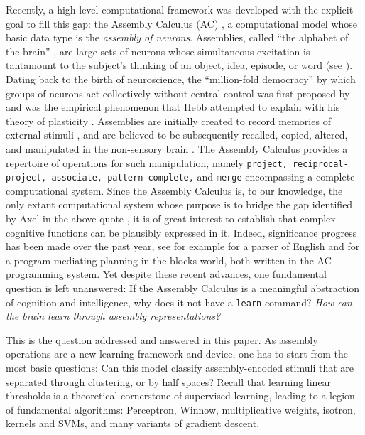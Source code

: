 \documentclass[final,12pt]{colt2022} %
\begin{document}
Recently, a high-level computational framework was developed with the explicit goal to fill this gap: the Assembly Calculus (AC)  \citep{papadimitriou2020brain}, a computational model whose basic data type is the {\em assembly of neurons}.  Assemblies, called ``the alphabet of the brain'' \citep{buzsaki2019brain}, are large sets of neurons whose simultaneous excitation is tantamount to the subject's thinking of an object, idea, episode, or word (see \citet{Josh2016}). Dating back to the birth of neuroscience, the ``million-fold democracy'' by which groups of neurons act collectively without central control was first proposed by \citet{sherrington1906integrative} and was the empirical phenomenon that Hebb attempted to explain with his theory of plasticity \citep{hebb1949}. Assemblies are initially created to record memories of external stimuli \citep{quiroga2016neuronal}, and are believed to be subsequently recalled, copied, altered, and manipulated in the non-sensory brain \citep{Josh2012, Buzsaki:10}.  The Assembly Calculus provides a repertoire of operations for such manipulation, namely {\tt project, reciprocal-project, associate, pattern-complete,} and {\tt merge} encompassing a complete computational system.  Since the Assembly Calculus is, to our knowledge, the only extant computational system whose purpose is to bridge the gap identified by Axel in the above quote \citep{AxelNeuron2018}, it is of great interest to establish that complex cognitive functions can be plausibly expressed in it.  Indeed, significance progress has been made over the past year, see for example \citet{mitropolsky2021biologically} for a parser of English and  \citet{damore2021planning} for a program mediating planning in the blocks world, both written in the AC programming system.  Yet despite these recent advances, one fundamental question is left unanswered: If the Assembly Calculus is a meaningful abstraction of cognition and intelligence, why does it not have a {\tt learn} command?  {\em How can the brain learn through  assembly representations?}  

This is the question addressed and answered in this paper. As assembly operations are a new learning framework and device, one has to start from the most basic questions: Can this model classify assembly-encoded stimuli that are separated through clustering, or by half spaces? Recall that learning linear thresholds is a theoretical cornerstone of supervised learning, leading to a legion of fundamental algorithms: Perceptron, Winnow, multiplicative weights, isotron, kernels and SVMs, and many variants of gradient descent. 
\end{document}
